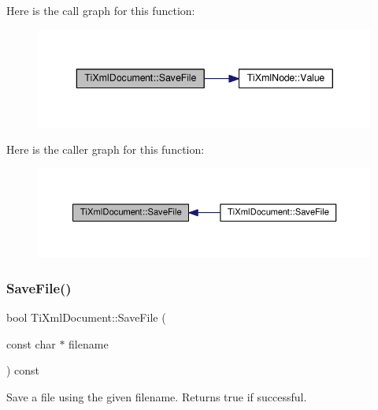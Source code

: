 Here is the call graph for this function\+:
\nopagebreak
\begin{figure}[H]
\begin{center}
\leavevmode
\includegraphics[width=343pt]{class_ti_xml_document_ab63b96a6af5a467e289c7c75202edad9_cgraph}
\end{center}
\end{figure}
Here is the caller graph for this function\+:
\nopagebreak
\begin{figure}[H]
\begin{center}
\leavevmode
\includegraphics[width=350pt]{class_ti_xml_document_ab63b96a6af5a467e289c7c75202edad9_icgraph}
\end{center}
\end{figure}
\mbox{\label{class_ti_xml_document_ae641f33784381017c44e107cc2c86b5c}} 
\subsubsection{\texorpdfstring{Save\+File()}{SaveFile()}\hspace{0.1cm}{\footnotesize\ttfamily [2/3]}}
{\footnotesize\ttfamily bool Ti\+Xml\+Document\+::\+Save\+File (\begin{DoxyParamCaption}\item[{const char $\ast$}]{filename }\end{DoxyParamCaption}) const}



Save a file using the given filename. Returns true if successful. 

